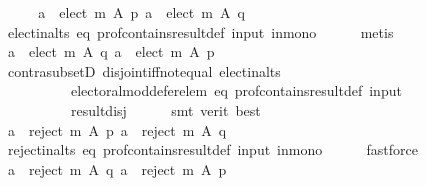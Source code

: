 \begin{isabellebody}
%
\isadelimproof
%
\endisadelimproof
%
\isatagproof
{}\isamarkupfalse%
\ {\isacharminus}{\kern0pt}\isanewline
\ \ \isamarkupfalse%
\ {\isachardoublequoteopen}{\isasymforall}a\ {\isasymin}\ elect\ m\ A\ p{\isachardot}{\kern0pt}\ a\ {\isasymin}\ elect\ m\ A\ q{\isachardoublequoteclose}\isanewline
\ \ \ \ \isamarkupfalse%
\ elect{\isacharunderscore}{\kern0pt}in{\isacharunderscore}{\kern0pt}alts\ eq\ prof{\isacharunderscore}{\kern0pt}contains{\isacharunderscore}{\kern0pt}result{\isacharunderscore}{\kern0pt}def\ input\ in{\isacharunderscore}{\kern0pt}mono\isanewline
\ \ \ \ \isamarkupfalse%
\ metis\isanewline
\ \ \isamarkupfalse%
\ \isamarkupfalse%
\ {\isachardoublequoteopen}{\isasymforall}a\ {\isasymin}\ elect\ m\ A\ q{\isachardot}{\kern0pt}\ a\ {\isasymin}\ elect\ m\ A\ p{\isachardoublequoteclose}\isanewline
\ \ \ \ \isamarkupfalse%
\ contra{\isacharunderscore}{\kern0pt}subsetD\ disjoint{\isacharunderscore}{\kern0pt}iff{\isacharunderscore}{\kern0pt}not{\isacharunderscore}{\kern0pt}equal\ elect{\isacharunderscore}{\kern0pt}in{\isacharunderscore}{\kern0pt}alts\isanewline
\ \ \ \ \ \ \ \ \ \ electoral{\isacharunderscore}{\kern0pt}mod{\isacharunderscore}{\kern0pt}defer{\isacharunderscore}{\kern0pt}elem\ eq\ prof{\isacharunderscore}{\kern0pt}contains{\isacharunderscore}{\kern0pt}result{\isacharunderscore}{\kern0pt}def\ input\isanewline
\ \ \ \ \ \ \ \ \ \ result{\isacharunderscore}{\kern0pt}disj\isanewline
\ \ \ \ \isamarkupfalse%
\ {\isacharparenleft}{\kern0pt}smt\ {\isacharparenleft}{\kern0pt}verit{\isacharcomma}{\kern0pt}\ best{\isacharparenright}{\kern0pt}{\isacharparenright}{\kern0pt}\isanewline
\ \ \isamarkupfalse%
\ \isamarkupfalse%
\ {\isachardoublequoteopen}{\isasymforall}a\ {\isasymin}\ reject\ m\ A\ p{\isachardot}{\kern0pt}\ a\ {\isasymin}\ reject\ m\ A\ q{\isachardoublequoteclose}\isanewline
\ \ \ \ \isamarkupfalse%
\ reject{\isacharunderscore}{\kern0pt}in{\isacharunderscore}{\kern0pt}alts\ eq\ prof{\isacharunderscore}{\kern0pt}contains{\isacharunderscore}{\kern0pt}result{\isacharunderscore}{\kern0pt}def\ input\ in{\isacharunderscore}{\kern0pt}mono\isanewline
\ \ \ \ \isamarkupfalse%
\ fastforce\isanewline
\ \ \isamarkupfalse%
\ \isamarkupfalse%
\ {\isachardoublequoteopen}{\isasymforall}a\ {\isasymin}\ reject\ m\ A\ q{\isachardot}{\kern0pt}\ a\ {\isasymin}\ reject\ m\ A\ p{\isachardoublequoteclose}\isanewline

\end{isabellebody}
